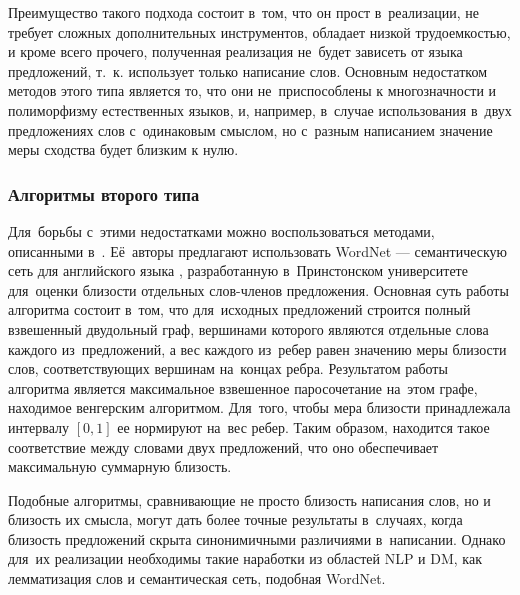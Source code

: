 Преимущество такого подхода состоит в~том, что он прост в~реализации, не требует
сложных дополнительных инструментов, обладает низкой трудоемкостью, и кроме всего прочего,
 полученная реализация не~будет зависеть от языка предложений, 
т.~к. использует только написание слов.
Основным недостатком методов этого типа является то, что они  не~приспособлены к многозначности и полиморфизму естественных языков, 
и, например, в~случае  использования в~двух предложениях слов с~одинаковым смыслом, но с~разным написанием 
значение меры сходства будет близким к нулю.

\subsubsection{Алгоритмы второго типа}
\label{sec:second_type_algorithm}
Для~борьбы с~этими недостатками можно воспользоваться методами, описанными в~\cite{wordnetSim}.
Её~авторы предлагают использовать WordNet --- семантическую сеть для английского языка \cite{wordnet}, 
разработанную в~Принстонском университете для~оценки близости отдельных слов-членов предложения.
Основная суть работы алгоритма состоит в~том, 
что для~исходных предложений строится полный взвешенный двудольный граф, 
вершинами которого являются отдельные слова каждого из~предложений, 
а вес каждого из~ребер равен значению меры близости слов,
соответствующих вершинам на~концах ребра. 
Результатом работы алгоритма является максимальное взвешенное паросочетание на~этом графе, 
находимое венгерским алгоритмом\cite{hungarian}.
Для~того, чтобы мера близости принадлежала интервалу $[0,1]$ ее нормируют на~вес ребер.
Таким образом, находится такое соответствие между словами двух предложений,
что оно обеспечивает максимальную суммарную близость.

Подобные алгоритмы, сравнивающие не просто близость написания слов, 
но и близость их смысла, могут дать более точные результаты в~случаях, 
когда близость предложений скрыта синонимичными различиями в~написании.
Однако для~их реализации необходимы такие наработки из областей NLP и DM,
как лемматизация слов и семантическая сеть, подобная WordNet\cite{wordnet}.


